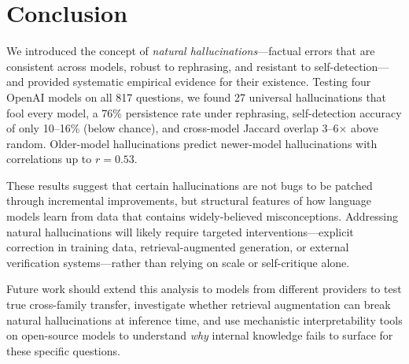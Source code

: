 \section{Conclusion}
\label{sec:conclusion}

We introduced the concept of \emph{natural hallucinations}---factual errors that are consistent across models, robust to rephrasing, and resistant to self-detection---and provided systematic empirical evidence for their existence.
Testing four OpenAI models on all 817 \truthfulqa questions, we found 27 universal hallucinations that fool every model, a 76\% persistence rate under rephrasing, self-detection accuracy of only 10--16\% (below chance), and cross-model Jaccard overlap 3--6$\times$ above random.
Older-model hallucinations predict newer-model hallucinations with correlations up to $r = 0.53$.

These results suggest that certain hallucinations are not bugs to be patched through incremental improvements, but structural features of how language models learn from data that contains widely-believed misconceptions.
Addressing natural hallucinations will likely require targeted interventions---explicit correction in training data, retrieval-augmented generation, or external verification systems---rather than relying on scale or self-critique alone.

Future work should extend this analysis to models from different providers to test true cross-family transfer, investigate whether retrieval augmentation can break natural hallucinations at inference time, and use mechanistic interpretability tools on open-source models to understand \emph{why} internal knowledge fails to surface for these specific questions.
